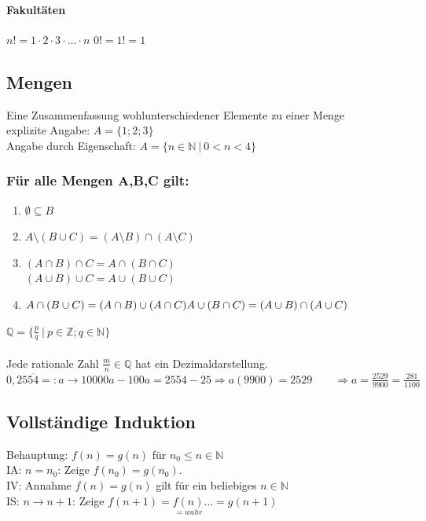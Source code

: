 \documentclass[6pt,a4paper]{scrartcl}
\begin{document}
\begin{multicols*}{4}
\paragraph{Fakultäten} %
\label{par:fakultaeten}
$n! = 1 \cdot 2 \cdot 3 \cdot \ldots \cdot n$ \qquad  $0! = 1! = 1$ 



\subsection{Mengen}

Eine Zusammenfassung wohlunterschiedener Elemente zu einer Menge\\
explizite Angabe: $A=\{1;2;3\}$\\
Angabe durch Eigenschaft: $A=\{n\in\mathbb N\ \vert\ 0<n<4\}$
\subsubsection{Für alle Mengen A,B,C gilt:}
\begin{enumerate}\itemsep-1pt
\item $\emptyset \subseteq B $
\item $A \setminus (B \cup C) = (A \setminus B) \cap (A \setminus C)$
\item $(A \cap B) \cap C = A \cap (B \cap C)$\\
	$(A \cup B) \cup C = A \cup (B \cup C)$
\item $A \cap (B \cup C) = (A \cap B) \cup (A \cap C) \\
	A \cup (B \cap C) = (A \cup B) \cap (A \cup C)$
\end{enumerate}


$\mathbb Q=\{\frac{p}{q}\ \vert\ p\in\mathbb Z; q\in\mathbb N\}$\\
\\
Jede rationale Zahl $\frac m n \in \mathbb Q$ hat ein Dezimaldarstellung.\\
$0,25\overline{54} =: a \rightarrow 10000a - 100a = 2554 -25 \Rightarrow a(9900) = 2529 \qquad \Rightarrow a = \frac{2529}{9900} = \frac{281}{1100}$

\subsection{Vollständige Induktion}
Behauptung: $f(n)=g(n)$ für $n_0 \le n \in \mathbb N$\\ 
IA: $n=n_0$: \quad Zeige $f(n_0)=g(n_0)$.\\
IV: Annahme $f(n)=g(n)$ gilt für ein beliebiges $n\in\mathbb N$\\
IS: $n \rightarrow n+1$: \quad Zeige $f(n+1)=\underset{=wahr}{f(n)}  \dotsc=g(n+1)$


\end{multicols*}
\end{document}
